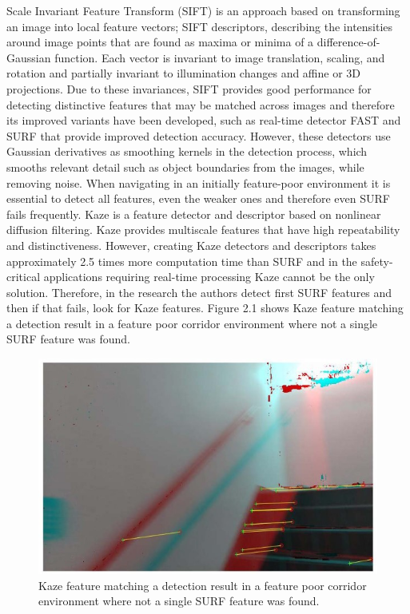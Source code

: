 Scale Invariant Feature Transform (SIFT) is an
approach based on transforming an image into local feature
vectors; SIFT descriptors, describing the intensities around
image points that are found as maxima or minima of a
difference-of-Gaussian function. Each vector is invariant to
image translation, scaling, and rotation and partially invariant
to illumination changes and affine or 3D projections. Due
to these invariances, SIFT provides good performance for
detecting distinctive features that may be matched across
images and therefore its improved variants have been developed, such as real-time detector FAST and SURF
that provide improved detection accuracy. However, these
detectors use Gaussian derivatives as smoothing kernels in
the detection process, which smooths relevant detail such as
object boundaries from the images, while removing noise.
When navigating in an initially feature-poor environment it
is essential to detect all features, even the weaker ones and
therefore even SURF fails frequently. Kaze is a feature
detector and descriptor based on nonlinear diffusion filtering.
Kaze provides multiscale features that have high repeatability
and distinctiveness. However, creating Kaze detectors and
descriptors takes approximately 2.5 times more computation
time than SURF and in the safety-critical applications requiring real-time processing Kaze cannot be the only solution.
Therefore, in the research the authors detect first SURF features and
then if that fails, look for Kaze features.
Figure 2.1 shows Kaze feature matching a detection result in
a feature poor corridor environment where not a single SURF
feature was found.
\begin{figure}
    \centering
    \includegraphics{f1.jpg}
    \caption{Kaze feature matching a detection result in
a feature poor corridor environment where not a single SURF
feature was found.}
    
\end{figure}

